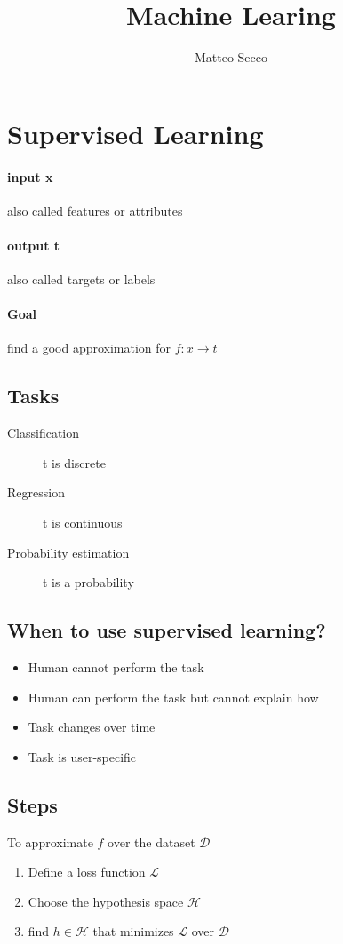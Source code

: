 \documentclass{article}
\author{Matteo Secco}
\title{Machine Learing}
\begin{document}
\maketitle\newpage
\tableofcontents\newpage


\section{Supervised  Learning}

\paragraph{input x} also called features or attributes

\paragraph{output t} also called targets or labels

\paragraph{Goal} find a good approximation for $f:x \to t$

\subsection{Tasks}
\begin{description}
\item[Classification] t is discrete
\item[Regression] t is continuous
\item[Probability estimation] t is a probability
\end{description}

\subsection{When to use supervised learning?}
\begin{itemize}
\item Human cannot perform the task
\item Human can perform the task but cannot explain how
\item Task changes over time
\item Task is user-specific
\end{itemize}

\subsection{Steps} 
To approximate $f$ over the dataset $\mathcal{D}$
\begin{enumerate}
\item Define a loss function $\mathcal{L}$
\item Choose the hypothesis space $\mathcal{H}$
\item find $h \in \mathcal{H}$ that minimizes $\mathcal{L}$ over $\mathcal{D}$
\end{enumerate}
\end{document}

